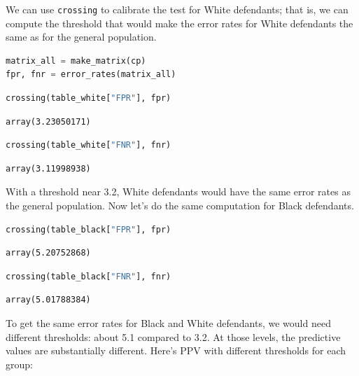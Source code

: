 We can use \passthrough{\lstinline!crossing!} to calibrate the test for
White defendants; that is, we can compute the threshold that would make
the error rates for White defendants the same as for the general
population.

\begin{lstlisting}[language=Python,style=source]
matrix_all = make_matrix(cp)
fpr, fnr = error_rates(matrix_all)
\end{lstlisting}

\begin{lstlisting}[language=Python,style=source]
crossing(table_white["FPR"], fpr)
\end{lstlisting}

\begin{lstlisting}[style=output]
array(3.23050171)
\end{lstlisting}

\begin{lstlisting}[language=Python,style=source]
crossing(table_white["FNR"], fnr)
\end{lstlisting}

\begin{lstlisting}[style=output]
array(3.11998938)
\end{lstlisting}

With a threshold near 3.2, White defendants would have the same error
rates as the general population. Now let's do the same computation for
Black defendants.

\begin{lstlisting}[language=Python,style=source]
crossing(table_black["FPR"], fpr)
\end{lstlisting}

\begin{lstlisting}[style=output]
array(5.20752868)
\end{lstlisting}

\begin{lstlisting}[language=Python,style=source]
crossing(table_black["FNR"], fnr)
\end{lstlisting}

\begin{lstlisting}[style=output]
array(5.01788384)
\end{lstlisting}

To get the same error rates for Black and White defendants, we would
need different thresholds: about 5.1 compared to 3.2. At those levels,
the predictive values are substantially different. Here's PPV with
different thresholds for each group:

